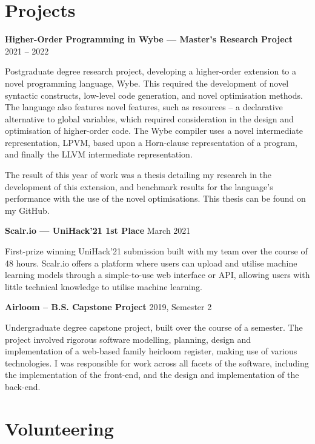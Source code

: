 \documentclass[9pt]{extarticle}
\newcommand{\entry}[3]{
    \textbf{#1} \newline
    {\footnotesize #2}
    \vspace{.05em}
    \begin{flushleft}
        #3
    \end{flushleft}
}
\begin{document}
\pagebreak

\section{Projects}

\entry{Higher-Order Programming in Wybe --- Master's Research Project}
{2021 -- 2022}
{
    Postgraduate degree research project, developing a higher-order extension to a novel programming language, Wybe.
    This required the development of novel syntactic constructs, low-level code generation, and novel optimisation methods.
    The language also features novel features, such as resources -- a declarative alternative to global variables, which 
    required consideration in the design and optimisation of higher-order code. 
    The Wybe compiler uses a novel intermediate representation, LPVM, based upon a Horn-clause representation of a program,
    and finally the LLVM intermediate representation.

    The result of this year of work was a thesis detailing my research in the development of this extension, and 
    benchmark results for the language's performance with the use of the novel optimisations. This thesis can be found on my GitHub.
}
\vspace{1.5em}

\entry{Scalr.io --- UniHack'21 1st Place}
{March 2021}
{
    First-prize winning UniHack'21 submission built with my team over the course of 48 hours. 
    Scalr.io offers a platform where users can upload and utilise machine learning models through a simple-to-use web interface or API,
    allowing users with little technical knowledge to utilise machine learning. 
}
\vspace{1.5em}

\entry{Airloom -- B.S. Capstone Project}
{2019, Semester 2}
{
    Undergraduate degree capstone project, built over the course of a semester. The project involved rigorous software modelling,
    planning, design and implementation of a web-based family heirloom register, making use of various technologies.
    I was responsible for work across all facets of the software, including the implementation of the front-end, 
    and the design and implementation of the back-end.
}
\vspace{1.5em}

\medskip

\section{Volunteering}
\end{document}
